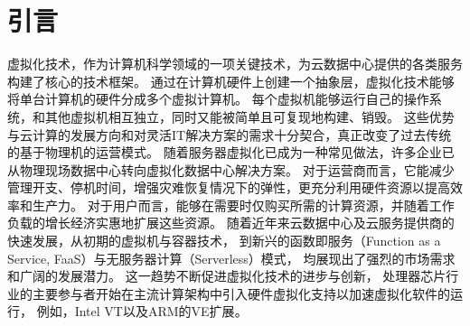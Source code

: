 \chapter{引言}






虚拟化技术，作为计算机科学领域的一项关键技术，为云数据中心提供的各类服务构建了核心的技术框架。
通过在计算机硬件上创建一个抽象层，虚拟化技术能够将单台计算机的硬件分成多个虚拟计算机。
每个虚拟机能够运行自己的操作系统，和其他虚拟机相互独立，同时又能被简单且可复现地构建、销毁。
这些优势与云计算的发展方向和对灵活IT解决方案的需求十分契合，真正改变了过去传统的基于物理机的运营模式。
随着服务器虚拟化已成为一种常见做法，许多企业已从物理现场数据中心转向虚拟化数据中心解决方案。
对于运营商而言，它能减少管理开支、停机时间，增强灾难恢复情况下的弹性，更充分利用硬件资源以提高效率和生产力。
对于用户而言，能够在需要时仅购买所需的计算资源，并随着工作负载的增长经济实惠地扩展这些资源。
随着近年来云数据中心及云服务提供商的快速发展，从初期的虚拟机与容器技术，
到新兴的函数即服务（Function as a Service, FaaS）与无服务器计算（Serverless）模式，
均展现出了强烈的市场需求和广阔的发展潜力。
这一趋势不断促进虚拟化技术的进步与创新，
处理器芯片行业的主要参与者开始在主流计算架构中引入硬件虚拟化支持以加速虚拟化软件的运行，
例如，Intel VT\cite{intel-VT2005Computer}以及ARM的VE扩展\cite{armve2018}。

